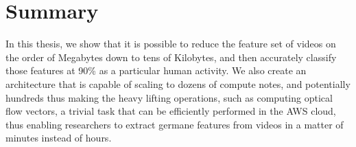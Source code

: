 \section{\label{section:summary}Summary}
In this thesis, we show that it is possible to reduce the feature set of
videos on the order of Megabytes down to tens of Kilobytes, and then accurately
classify those features at 90\% as a particular human activity. We also create
an architecture that is capable of scaling to dozens of compute notes, and
potentially hundreds thus making the heavy lifting operations, such as computing
optical flow vectors, a trivial task that can be efficiently performed in the
AWS cloud, thus enabling researchers to extract germane features from videos in a
matter of minutes instead of hours.
